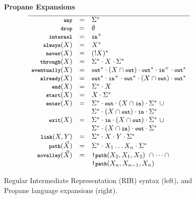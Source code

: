 \documentclass{sig-alternate-10pt}
\newcommand{\KW}[1]{\texttt{\small\bfseries{#1}}}
\newcommand{\Any}{\KW{any}}
\newcommand{\None}{\KW{drop}}
\newcommand{\In}{\KW{in}}
\newcommand{\Out}{\KW{out}}
\newcommand{\NOT}{\texttt{!}}
\newcommand{\Exit}{\KW{exit}}
\newcommand{\End}{\KW{end}}
\newcommand{\Start}{\KW{start}}
\newcommand{\Enter}{\KW{enter}}
\newcommand{\Eventually}{\KW{eventually}}
\newcommand{\Already}{\KW{already}}
\newcommand{\Internal}{\KW{internal}}
\newcommand{\Never}{\KW{never}}
\newcommand{\Always}{\KW{always}}
\newcommand{\Through}{\KW{through}}
\newcommand{\LinkKW}{\KW{link}}
\newcommand{\PathKW}{\KW{path}}
\newcommand{\Novalley}{\KW{novalley}}
\newcommand{\hdr}[2]{\flushleft \chdr{\hspace{5mm}#1}{#2}}
\newcommand{\chdr}[2]{\textbf{#1} {#2} \\ \centering}%
\begin{document}
\begin{figure}[t!]
\begin{minipage}[t]{.45\linewidth}
  \end{minipage}
  ~~
  \vrule
  ~~
  \begin{minipage}[t]{.5\linewidth}\small
  \hdr{Propane Expansions}{}
  \vspace*{-1\baselineskip}
  \[\begin{array}{rcl}
    \hline
    \Any               & = & \Sigma^* \\
    \None              & = & \emptyset \\
    \Internal          & = & \In^+ \\
    \Always(X)         & = & X^* \\
    \Never(X)          & = & (!X)^* \\
    \Through(X)        & = & \Sigma^* \cdot X \cdot \Sigma^* \\
    \Eventually(X)     & = & \Out^* \cdot (X \cap \Out) \cdot \Out^* \cdot \In^+ \cdot \Out^* \\
    \Already(X)        & = & \Out^* \cdot \In^+ \cdot \Out^* \cdot (X \cap \Out) \cdot \Out^* \\
    \End(X)            & = & \Sigma^* \cdot X \\
    \Start(X)          & = & X \cdot \Sigma^* \\
    \Enter(X)          & = & \Sigma^* \cdot \Out \cdot (X \cap \In) \cdot \Sigma^* ~ \cup \\
                       &   & \Sigma^* \cdot (X \cap \Out) \cdot \In \cdot \Sigma^* \\
    \Exit(X)           & = & \Sigma^* \cdot \In \cdot (X \cap \Out) \cdot \Sigma^* ~ \cup \\
                       &   & \Sigma^* \cdot (X \cap \In) \cdot \Out \cdot \Sigma^* \\
    \LinkKW(X,Y)       & = & \Sigma^* \cdot X \cdot Y \cdot \Sigma^* \\
    \PathKW(\vec{X})   & = & \Sigma^* \cdot X_1 \dots X_n \cdot \Sigma^* \\
    \Novalley(\vec{X}) & = & \NOT\PathKW(X_2,X_1,X_2) ~ \cap \dots \cap \\
                       &   & \NOT\PathKW(X_n,X_{n-1},X_n) \\
  \end{array} \]%

  \end{minipage}%

  \hrulefill%

  \caption{Regular Intermediate Representation (RIR) syntax (left), and
           Propane language expansions (right).}
  \label{fig:rir-syntax}
\end{figure}%
\end{document}
